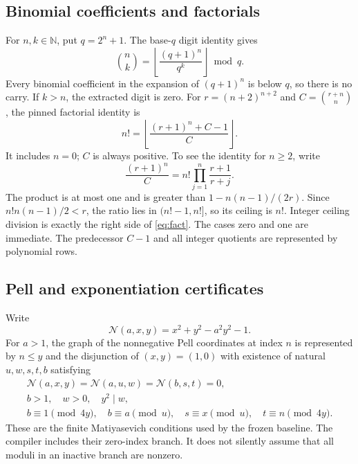 \documentclass[11pt,a4paper]{article}
\theoremstyle{definition}\newtheorem{definition}[theorem]{Definition}
\theoremstyle{remark}\newtheorem{remark}[theorem]{Remark}
\newcommand{\N}{\mathbb N}\newcommand{\Z}{\mathbb Z}\newcommand{\Q}{\mathbb Q}
\numberwithin{equation}{section}
\begin{document}
\subsection{Binomial coefficients and factorials}
For \(n,k\in\N\), put \(q=2^n+1\). The base-\(q\) digit identity
gives
\begin{equation}
 \binom nk=
 \left\lfloor\frac{(q+1)^n}{q^k}\right\rfloor\bmod q.
\label{eq:binom}
\end{equation}
Every binomial coefficient in the expansion of \((q+1)^n\) is below
\(q\), so there is no carry. If \(k>n\), the extracted digit is zero.
For \(r=(n+2)^{n+2}\) and \(C=\binom{r+n}{n}\), the pinned factorial
identity is
\begin{equation}
 n!=\left\lfloor\frac{(r+1)^n+C-1}{C}\right\rfloor.
\label{eq:fact}
\end{equation}
It includes \(n=0\); \(C\) is always positive. To see the identity for
\(n\ge2\), write
\[
 \frac{(r+1)^n}{C}
  =n!\prod_{j=1}^n\frac{r+1}{r+j}.
\]
The product is at most one and is greater than
\(1-n(n-1)/(2r)\). Since \(n!n(n-1)/2<r\), the ratio lies in
\((n!-1,n!]\), so its ceiling is \(n!\). Integer ceiling division
is exactly the right side of \eqref{eq:fact}. The cases zero and one
are immediate. The predecessor \(C-1\) and all integer quotients are
represented by polynomial rows.

\subsection{Pell and exponentiation certificates}
Write
\[
 \mathcal N(a,x,y)=x^2+y^2-a^2y^2-1.
\]
For \(a>1\), the graph of the nonnegative Pell coordinates at index
\(n\) is represented by \(n\le y\) and the disjunction of
\((x,y)=(1,0)\) with existence of natural \(u,w,s,t,b\) satisfying
\begin{gather}
 \mathcal N(a,x,y)=\mathcal N(a,u,w)=\mathcal N(b,s,t)=0,\nonumber\\
 b>1,\quad w>0,\quad y^2\mid w,\nonumber\\
 b\equiv1\pmod{4y},\quad b\equiv a\pmod u,
 \quad s\equiv x\pmod u,\quad t\equiv n\pmod{4y}.
\label{eq:pell}
\end{gather}
These are the finite Matiyasevich conditions used by the frozen baseline.
The compiler includes their zero-index branch. It does not silently
assume that all moduli in an inactive branch are nonzero.
\end{document}
